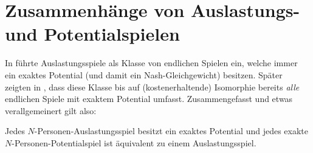 \section{Zusammenhänge von Auslastungs- und Potentialspielen}\label{sec:Auslastungsspiele}

In \cite{RosenthalPotential} führte \citeauthor{RosenthalPotential} Auslastungsspiele als Klasse von endlichen Spielen ein, welche immer ein exaktes Potential (und damit ein Nash-Gleichgewicht) besitzen. Später zeigten \citeauthor{MonShap} in \cite[Theorem 3.2]{MonShap}, dass diese Klasse bis auf (kostenerhaltende) Isomorphie bereits \emph{alle} endlichen Spiele mit exaktem Potential umfasst. Zusammengefasst und etwas verallgemeinert gilt also:

\begin{satz}\label{satz:MondererShapley}
	Jedes $N$-Personen-Auslastungsspiel besitzt ein exaktes Potential und jedes exakte $N$-Personen-Potentialspiel ist äquivalent zu einem Auslastungsspiel.
\end{satz}

